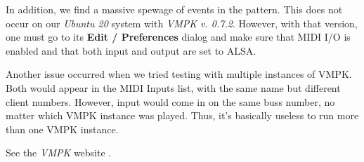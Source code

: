    In addition, we find a massive spewage of events in the pattern.
   This does not occur on our \textsl{Ubuntu 20} system with
   \textsl{VMPK v. 0.7.2}.
   However, with that version, one must go to its \textbf{Edit / Preferences}
   dialog and make sure that MIDI I/O is enabled and that both input
   and output are set to ALSA.

   Another issue occurred when we tried testing with multiple instances
   of VMPK. Both would appear in the MIDI Inputs list, with the same name but
   different client numbers.  However, input would come in on the same buss
   number, no matter which VMPK instance was played.
   Thus, it's basically useless to run more than one VMPK instance.

   See the \textsl{VMPK} website \cite{vmpk}.

